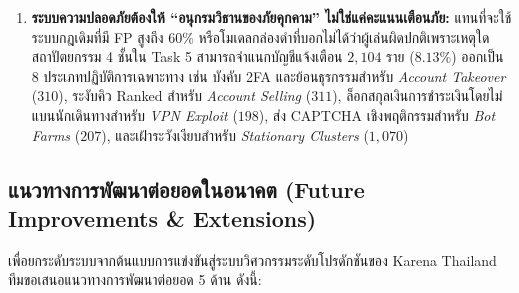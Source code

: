 \begin{enumerate}
  \item \textbf{ระบบความปลอดภัยต้องให้ ``อนุกรมวิธานของภัยคุกคาม'' ไม่ใช่แค่คะแนนเตือนภัย:}
  แทนที่จะใช้ระบบกฎเดิมที่มี FP สูงถึง $60\%$ หรือโมเดลกล่องดำที่บอกไม่ได้ว่าผู้เล่นผิดปกติเพราะเหตุใด สถาปัตยกรรม 4 ชั้นใน Task 5 สามารถจำแนกบัญชีแจ้งเตือน $2{,}104$ ราย ($8.13\%$) ออกเป็น 8 ประเภทปฏิบัติการเฉพาะทาง เช่น บังคับ 2FA และย้อนธุรกรรมสำหรับ \emph{Account Takeover} ($310$), ระงับคิว Ranked สำหรับ \emph{Account Selling} ($311$), ล็อกสกุลเงินการชำระเงินโดยไม่แบนนักเดินทางสำหรับ \emph{VPN Exploit} ($198$), ส่ง CAPTCHA เชิงพฤติกรรมสำหรับ \emph{Bot Farms} ($207$), และเฝ้าระวังเงียบสำหรับ \emph{Stationary Clusters} ($1{,}070$)
\end{enumerate}

\subsection{แนวทางการพัฒนาต่อยอดในอนาคต (Future Improvements \& Extensions)}
\label{subsec:future_work}

เพื่อยกระดับระบบจากต้นแบบการแข่งขันสู่ระบบวิศวกรรมระดับโปรดักชันของ Karena Thailand ทีมขอเสนอแนวทางการพัฒนาต่อยอด 5 ด้าน ดังนี้:

